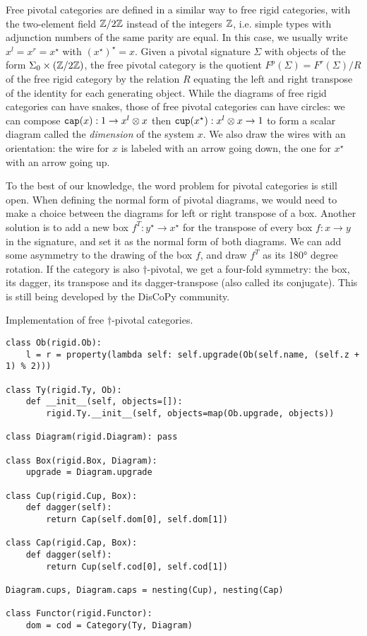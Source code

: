 Free pivotal categories are defined in a similar way to free rigid categories, with the two-element field $\mathbb{Z} / 2 \mathbb{Z}$ instead of the integers $\mathbb{Z}$, i.e. simple types with adjunction numbers of the same parity are equal.
In this case, we usually write $x^l = x^r = x^\star$ with $(x^\star)^\star = x$.
Given a pivotal signature $\Sigma$ with objects of the form $\Sigma_0 \times (\mathbb{Z} / 2 \mathbb{Z})$, the free pivotal category is the quotient $F^p(\Sigma) = F^r(\Sigma) / R$ of the free rigid category by the relation $R$ equating the left and right transpose of the identity for each generating object.
While the diagrams of free rigid categories can have snakes, those of free pivotal categories can have circles: we can compose $\mathtt{cap}(x) : 1 \to x^l \otimes x$ then $\mathtt{cup}(x^\star) : x^l \otimes x \to 1$ to form a scalar diagram called the \emph{dimension} of the system $x$.
We also draw the wires with an orientation: the wire for $x$ is labeled with an arrow going down, the one for $x^\star$ with an arrow going up.

To the best of our knowledge, the word problem for pivotal categories is still open.
When defining the normal form of pivotal diagrams, we would need to make a choice between the diagrams for left or right transpose of a box.
Another solution is to add a new box $f^T : y^\star \to x^\star$ for the transpose of every box $f : x \to y$ in the signature, and set it as the normal form of both diagrams.
We can add some asymmetry to the drawing of the box $f$, and draw $f^T$ as its 180° degree rotation.
If the category is also $\dagger$-pivotal, we get a four-fold symmetry: the box, its dagger, its transpose and its dagger-transpose (also called its conjugate).
This is still being developed by the DisCoPy community.

\begin{python}
{\normalfont Implementation of free $\dagger$-pivotal categories.}

\begin{verbatim}
class Ob(rigid.Ob):
    l = r = property(lambda self: self.upgrade(Ob(self.name, (self.z + 1) % 2)))

class Ty(rigid.Ty, Ob):
    def __init__(self, objects=[]):
        rigid.Ty.__init__(self, objects=map(Ob.upgrade, objects))

class Diagram(rigid.Diagram): pass

class Box(rigid.Box, Diagram):
    upgrade = Diagram.upgrade

class Cup(rigid.Cup, Box):
    def dagger(self):
        return Cap(self.dom[0], self.dom[1])

class Cap(rigid.Cap, Box):
    def dagger(self):
        return Cup(self.cod[0], self.cod[1])

Diagram.cups, Diagram.caps = nesting(Cup), nesting(Cap)

class Functor(rigid.Functor):
    dom = cod = Category(Ty, Diagram)
\end{verbatim}
\end{python}

